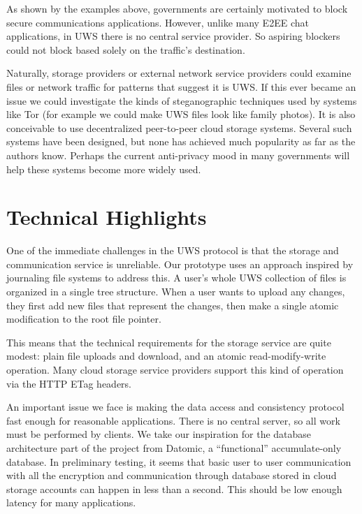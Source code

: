 \documentclass{sig-alternate-hotpets}
\begin{document}
As shown by the examples above, governments are certainly motivated to block secure communications applications.
However, unlike many E2EE chat applications, in UWS there is no central service provider.
So aspiring blockers could not block based solely on the traffic's destination.

Naturally, storage providers or external network service providers could examine files or network traffic for patterns that suggest it is UWS.
If this ever became an issue we could investigate the kinds of steganographic techniques used by systems like Tor (for example we could make UWS files look like family photos).
It is also conceivable to use decentralized peer-to-peer cloud storage systems.
Several such systems have been designed, but none has achieved much popularity as far as the authors know.
Perhaps the current anti-privacy mood in many governments will help these systems become more widely used.

\section{Technical Highlights}

One of the immediate challenges in the UWS protocol is that the storage and communication service is unreliable.
Our prototype uses an approach inspired by journaling file systems to address this.
A user's whole UWS collection of files is organized in a single tree structure.
When a user wants to upload any changes, they first add new files that represent the changes, then make a single atomic modification to the root file pointer.

This means that the technical requirements for the storage service are quite modest: plain file uploads and download, and an atomic read-modify-write operation.
Many cloud storage service providers support this kind of operation via the HTTP ETag headers.

An important issue we face is making the data access and consistency protocol fast enough for reasonable applications.
There is no central server, so all work must be performed by clients.
We take our inspiration for the database architecture part of the project from Datomic, a ``functional'' accumulate-only database.
In preliminary testing, it seems that basic user to user communication with all the encryption and communication through database stored in cloud storage accounts can happen in less than a second.
This should be low enough latency for many applications.
\end{document}
